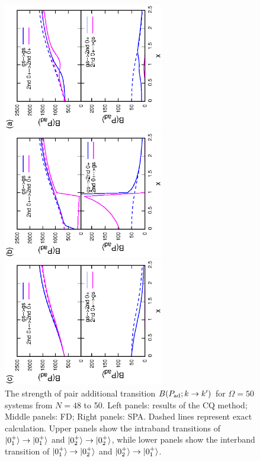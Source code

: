 \documentclass[%
superscriptaddress,
preprint,
showpacs,
nofootinbib,
amsmath,amssymb,
aps,
prc,
floatfix ]%
{revtex4-1}
\begin{document}
\begin{figure}[t]
 \begin{minipage}{0.3\hsize}
 \begin{center}
  \includegraphics[width=70mm,angle=-90]{N50Pad_CQ.eps}
 \end{center}
 \captionsetup{labelformat=empty,labelsep=none}
 \end{minipage}
 \begin{minipage}{0.3\hsize}
 \begin{center}
  \includegraphics[width=70mm,angle=-90]{N50Pad_FD.eps}
 \end{center}
 \captionsetup{labelformat=empty,labelsep=none}
 \end{minipage}
 \begin{minipage}{0.3\hsize}
 \begin{center}
  \includegraphics[width=70mm,angle=-90]{N50Pad_SPA.eps}
 \end{center}
 \captionsetup{labelformat=empty,labelsep=none}
 \end{minipage}
 \caption{The strength of pair additional transition
$B(P_{\rm ad};k\rightarrow k')$ for $\Omega=50$ systems
from $N=48$ to 50.
Left panels: results of the CQ method; Middle panels: FD; Right panels: SPA.
Dashed lines represent exact calculation.
Upper panels show the intraband transitions of
$\ket{0_1^+}\to\ket{0_1^+}$ and $\ket{0_2^+}\to\ket{0_2^+}$,
while lower panels show the interband transition of
$\ket{0_1^+}\to\ket{0_2^+}$ and $\ket{0_2^+}\to\ket{0_1^+}$.
}
 \label{fig:N50Pad}
\end{figure}
\end{document}
